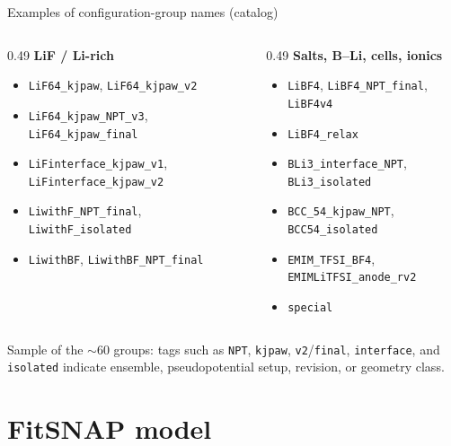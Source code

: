 \documentclass[aspectratio=169]{beamer}
\begin{document}
\begin{frame}{Examples of configuration-group names (catalog)}
  \small
  \begin{columns}[T,onlytextwidth]
    \begin{column}{0.49\textwidth}
      \textbf{LiF / Li-rich}
      \begin{itemize}\setlength\itemsep{0.15em}
        \item \texttt{LiF64\_kjpaw}, \texttt{LiF64\_kjpaw\_v2}
        \item \texttt{LiF64\_kjpaw\_NPT\_v3}, \texttt{LiF64\_kjpaw\_final}
        \item \texttt{LiFinterface\_kjpaw\_v1}, \texttt{LiFinterface\_kjpaw\_v2}
        \item \texttt{LiwithF\_NPT\_final}, \texttt{LiwithF\_isolated}
        \item \texttt{LiwithBF}, \texttt{LiwithBF\_NPT\_final}
      \end{itemize}
    \end{column}
    \begin{column}{0.49\textwidth}
      \textbf{Salts, B--Li, cells, ionics}
      \begin{itemize}\setlength\itemsep{0.15em}
        \item \texttt{LiBF4}, \texttt{LiBF4\_NPT\_final}, \texttt{LiBF4v4}
        \item \texttt{LiBF4\_relax}
        \item \texttt{BLi3\_interface\_NPT}, \texttt{BLi3\_isolated}
        \item \texttt{BCC\_54\_kjpaw\_NPT}, \texttt{BCC54\_isolated}
        \item \texttt{EMIM\_TFSI\_BF4}, \texttt{EMIMLiTFSI\_anode\_rv2}
        \item \texttt{special}
      \end{itemize}
    \end{column}
  \end{columns}
  \vfill
  \tiny
  Sample of the $\sim$60 groups: tags such as \texttt{NPT}, \texttt{kjpaw}, \texttt{v2}/\texttt{final}, \texttt{interface}, and \texttt{isolated} indicate ensemble, pseudopotential setup, revision, or geometry class.
\end{frame}

\section{FitSNAP model}
\end{document}
